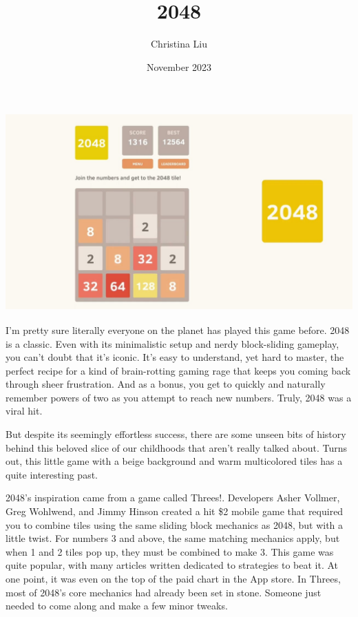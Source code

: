 \documentclass{article}
\title{2048}
\author{Christina Liu}
\date{November 2023}
\begin{document}
\maketitle

\includegraphics[height=3in]{images/2048_preview.png}

I’m pretty sure literally everyone on the planet has played this game before. 2048 is a classic. Even with its minimalistic setup and nerdy block-sliding gameplay, you can’t doubt that it’s iconic. It’s easy to understand, yet hard to master, the perfect recipe for a kind of brain-rotting gaming rage that keeps you coming back through sheer frustration. And as a bonus, you get to quickly and naturally remember powers of two as you attempt to reach new numbers. Truly, 2048 was a viral hit.

But despite its seemingly effortless success, there are some unseen bits of history behind this beloved slice of our childhoods that aren’t really talked about. Turns out, this little game with a beige background and warm multicolored tiles has a quite interesting past.
\newline

2048’s inspiration came from a game called Threes!. Developers Asher Vollmer, Greg Wohlwend, and Jimmy Hinson created a hit \$2 mobile game that required you to combine tiles using the same sliding block mechanics as 2048, but with a little twist. For numbers 3 and above, the same matching mechanics apply, but when 1 and 2 tiles pop up, they must be combined to make 3. This game was quite popular, with many articles written dedicated to strategies to beat it. At one point, it was even on the top of the paid chart in the App store. In Threes, most of 2048’s core mechanics had already been set in stone. Someone just needed to come along and make a few minor tweaks.
\end{document}
